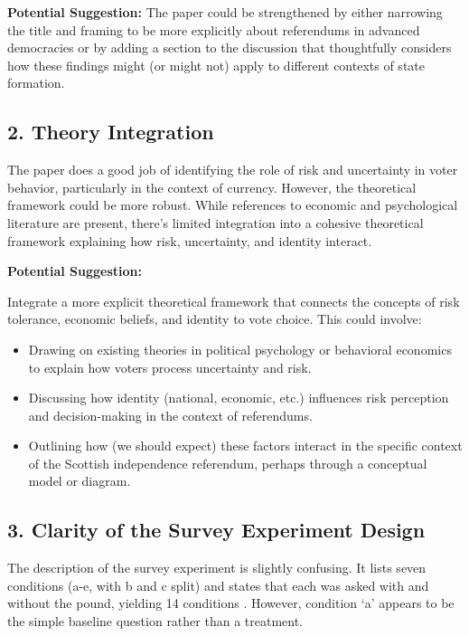 \documentclass[
  letterpaper,
  DIV=11,
  numbers=noendperiod]{scrartcl}
\providecommand{\tightlist}{%
  \setlength{\itemsep}{0pt}\setlength{\parskip}{0pt}}\usepackage{longtable,booktabs,array}
\begin{document}
\textbf{Potential Suggestion:} The paper could be strengthened by either
narrowing the title and framing to be more explicitly about referendums
in advanced democracies or by adding a section to the discussion that
thoughtfully considers how these findings might (or might not) apply to
different contexts of state formation.

\subsection{2. Theory Integration}\label{theory-integration}

The paper does a good job of identifying the role of risk and
uncertainty in voter behavior, particularly in the context of currency.
However, the theoretical framework could be more robust. While
references to economic and psychological literature are present, there's
limited integration into a cohesive theoretical framework explaining how
risk, uncertainty, and identity interact.

\textbf{Potential Suggestion:}

Integrate a more explicit theoretical framework that connects the
concepts of risk tolerance, economic beliefs, and identity to vote
choice. This could involve:

\begin{itemize}
\tightlist
\item
  Drawing on existing theories in political psychology or behavioral
  economics to explain how voters process uncertainty and risk.
\item
  Discussing how identity (national, economic, etc.) influences risk
  perception and decision-making in the context of referendums.
\item
  Outlining how (we should expect) these factors interact in the
  specific context of the Scottish independence referendum, perhaps
  through a conceptual model or diagram.
\end{itemize}

\subsection{3. Clarity of the Survey Experiment
Design}\label{clarity-of-the-survey-experiment-design}

The description of the survey experiment is slightly confusing. It lists
seven conditions (a-e, with b and c split) and states that each was
asked with and without the pound, yielding 14 conditions . However,
condition `a' appears to be the simple baseline question rather than a
treatment.
\end{document}
